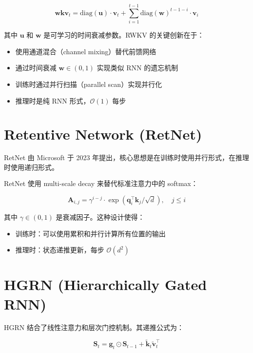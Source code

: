 \begin{equation}
    \mathbf{wkv}_t = \text{diag}(\mathbf{u}) \cdot \mathbf{v}_t + \sum_{i=1}^{t-1} \text{diag}(\mathbf{w})^{t-1-i} \cdot \mathbf{v}_i
\end{equation}

其中 $\mathbf{u}$ 和 $\mathbf{w}$ 是可学习的时间衰减参数。RWKV 的关键创新在于：

\begin{itemize}
    \item 使用通道混合（channel mixing）替代前馈网络
    \item 通过时间衰减 $\mathbf{w} \in (0, 1)$ 实现类似 RNN 的遗忘机制
    \item 训练时通过并行扫描（parallel scan）实现并行化
    \item 推理时是纯 RNN 形式，$\mathcal{O}(1)$ 每步
\end{itemize}

\section{Retentive Network (RetNet)}

RetNet 由 Microsoft 于 2023 年提出，核心思想是在训练时使用并行形式，在推理时使用递归形式。

RetNet 使用 multi-scale decay 来替代标准注意力中的 softmax：

\begin{equation}
    \mathbf{A}_{i,j} = \gamma^{i-j} \cdot \exp(\mathbf{q}_i^\top \mathbf{k}_j / \sqrt{d}), \quad j \leq i
\end{equation}

其中 $\gamma \in (0, 1)$ 是衰减因子。这种设计使得：

\begin{itemize}
    \item 训练时：可以使用累积和并行计算所有位置的输出
    \item 推理时：状态递推更新，每步 $\mathcal{O}(d^2)$
\end{itemize}

\section{HGRN (Hierarchically Gated RNN)}

HGRN 结合了线性注意力和层次门控机制。其递推公式为：

\begin{equation}
    \mathbf{S}_t = \mathbf{g}_t \odot \mathbf{S}_{t-1} + \tilde{\mathbf{k}}_t \tilde{\mathbf{v}}_t^\top
\end{equation}

